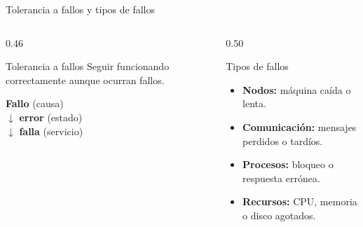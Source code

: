 \renewcommand{\fuentespie}{Fuentes: \cite{assiri2025,mushtaq2024}}
\begin{frame}{Tolerancia a fallos y tipos de fallos}
  \begin{columns}[T,onlytextwidth]
    \begin{column}{0.46\textwidth}
      \begin{block}{Tolerancia a fallos}
        Seguir funcionando correctamente aunque ocurran fallos.~\cite{assiri2025}
      \end{block}

      \vspace{0.8em}
      {\small
      \textbf{Fallo} (causa)\\
      $\downarrow$ \textbf{error} (estado)\\
      $\downarrow$ \textbf{falla} (servicio)~\cite{mushtaq2024}\par}
    \end{column}

    \begin{column}{0.50\textwidth}
      \begin{block}{Tipos de fallos}
        \small
        \begin{itemize}
          \item \textbf{Nodos:} máquina caída o lenta.
          \item \textbf{Comunicación:} mensajes perdidos o tardíos.
          \item \textbf{Procesos:} bloqueo o respuesta errónea.
          \item \textbf{Recursos:} CPU, memoria o disco agotados.~\cite{mushtaq2024}
        \end{itemize}
      \end{block}
    \end{column}
  \end{columns}
\end{frame}
\renewcommand{\fuentespie}{Fuentes: [PENDIENTE]}


